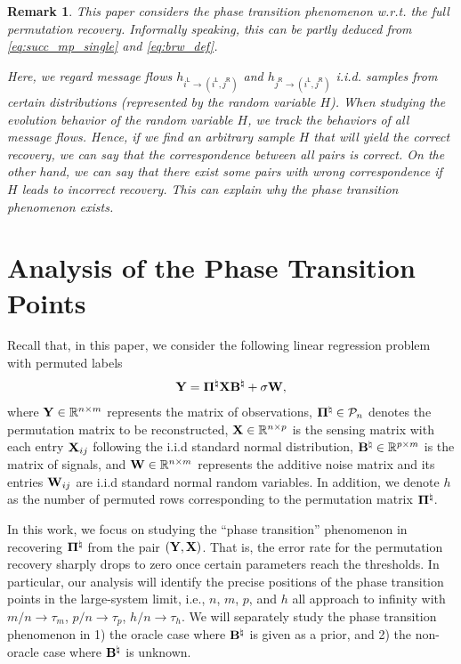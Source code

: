 \documentclass[11pt]{article}
\newtheorem{remark}{Remark}
\def\ln#1{{#1}^{\mathsf{L}}}
\def\rn#1{{#1}^{\mathsf{R}}}
\def\lloginfo#1#2{h_{\ln{#1}\rightarrow (\ln{#1}, \rn{#2})}}
\def\rloginfo#1#2{h_{\rn{#2}\rightarrow (\ln{#1}, \rn{#2})}}
\begin{document}
\vspace{0.1in}
\begin{remark}
This paper considers the phase transition phenomenon w.r.t. the full permutation recovery.
Informally speaking, this can be partly deduced from \eqref{eq:succ_mp_single} and \eqref{eq:brw_def}.

Here, we regard message flows $\lloginfo{i}{j}$ and
 $\rloginfo{i}{j}$ i.i.d. samples from certain distributions (represented by the random variable $H$).
When studying the evolution behavior of the random variable
$H$, we track the behaviors of all message flows. Hence, if we find an arbitrary sample $H$
 that will yield the correct recovery, we can say that the correspondence between all pairs is correct. On the other hand, we can say that there exist some pairs with wrong correspondence if $H$ leads to incorrect recovery. This can explain why the phase transition phenomenon exists.
\end{remark}

\section{Analysis of the Phase Transition Points}\label{sec:oracle_case}

Recall that, in this paper, we consider the following linear regression problem with permuted labels
\begin{align}\notag
\mathbf{Y} = \boldsymbol{\Pi}^{\natural}\mathbf{X}\mathbf{B}^{\natural} + \sigma \mathbf{W},
\end{align}
where $\mathbf{Y}\in \mathbb{R}^{n\times m}$ represents the matrix of observations,
$\boldsymbol{\Pi}^{\natural} \in {\cal P}_n$ denotes the permutation matrix  to be
reconstructed, $\mathbf{X}\in \mathbb{R}^{n\times p}$ is the sensing matrix with each entry
$\mathbf{X}_{ij}$ following the i.i.d standard normal distribution,
$\mathbf{B}^{\natural}\in \mathbb{R}^{p\times m}$ is the matrix of signals,
and $\mathbf{W}\in \mathbb{R}^{n\times m}$ represents the additive noise matrix
and its entries $\mathbf{W}_{ij}$ are i.i.d standard normal random variables.
In addition, we denote $h$ as the number
of permuted rows corresponding to the permutation matrix
$\boldsymbol{\Pi}^{\natural}$.

In this work, we  focus on studying the ``phase transition'' phenomenon in recovering  $\boldsymbol{\Pi}^{\natural}$ from the pair $\left(\mathbf{Y}, \mathbf{X}\right)$. That is,  the error rate for the permutation recovery sharply drops to zero once certain parameters reach the thresholds. In particular, our analysis will
identify the precise positions of the phase transition points in the large-system limit, i.e.,
$n$, $m$, $p$, and $h$
all approach to infinity with
$m/n\rightarrow \tau_m$, $p/n\rightarrow\tau_p$, $h/n\rightarrow \tau_h$.  We will separately study
the phase transition phenomenon in 1) the oracle case where $\mathbf{B}^{\natural}$ is given as a prior,
and 2)  the non-oracle case where $\mathbf{B}^{\natural}$ is unknown.
\end{document}

